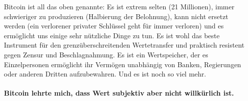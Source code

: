 Bitcoin ist all das oben genannte: Es ist extrem selten (21 Millionen), immer
schwieriger zu produzieren (Halbierung der Belohnung), kann nicht ersetzt werden
(ein verlorener privater Schlüssel geht für immer verloren) und es ermöglicht
uns einige sehr nützliche Dinge zu tun. Es ist wohl das beste Instrument für den
grenzüberschreitenden Wertetransfer und praktisch resistent gegen Zensur und
Beschlagnahmung. Es ist ein Wertspeicher, der es Einzelpersonen ermöglicht ihr
Vermögen unabhängig von Banken, Regierungen oder anderen Dritten aufzubewahren.
Und es ist noch so viel mehr.

\paragraph{Bitcoin lehrte mich, dass Wert subjektiv aber nicht willkürlich ist.}

%
%
%
%
